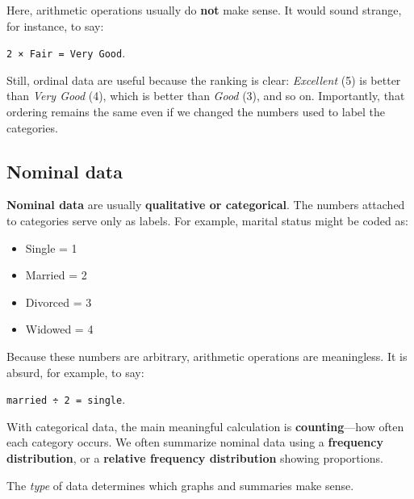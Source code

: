 \documentclass[
  letterpaper,
  DIV=11,
  numbers=noendperiod]{scrreprt}
\providecommand{\tightlist}{%
  \setlength{\itemsep}{0pt}\setlength{\parskip}{0pt}}
\begin{document}
Here, arithmetic operations usually do \textbf{not} make sense. It would
sound strange, for instance, to say:

\texttt{2\ ×\ Fair\ =\ Very\ Good}.

Still, ordinal data are useful because the ranking is clear:
\emph{Excellent} (5) is better than \emph{Very Good} (4), which is
better than \emph{Good} (3), and so on. Importantly, that ordering
remains the same even if we changed the numbers used to label the
categories.

\subsection{Nominal data}\label{nominal-data}

\textbf{Nominal data} are usually \textbf{qualitative or categorical}.
The numbers attached to categories serve only as labels. For example,
marital status might be coded as:

\begin{itemize}
\tightlist
\item
  Single = 1\\
\item
  Married = 2\\
\item
  Divorced = 3\\
\item
  Widowed = 4
\end{itemize}

Because these numbers are arbitrary, arithmetic operations are
meaningless. It is absurd, for example, to say:

\texttt{married\ ÷\ 2\ =\ single}.

With categorical data, the main meaningful calculation is
\textbf{counting}---how often each category occurs. We often summarize
nominal data using a \textbf{frequency distribution}, or a
\textbf{relative frequency distribution} showing proportions.

\begin{tcolorbox}[enhanced jigsaw, coltitle=black, colbacktitle=quarto-callout-important-color!10!white, left=2mm, bottomrule=.15mm, bottomtitle=1mm, colback=white, titlerule=0mm, colframe=quarto-callout-important-color-frame, breakable, leftrule=.75mm, toptitle=1mm, opacitybacktitle=0.6, rightrule=.15mm, title=\textcolor{quarto-callout-important-color}{\faExclamation}\hspace{0.5em}{Key idea}, arc=.35mm, opacityback=0, toprule=.15mm]

The \emph{type} of data determines which graphs and summaries make
sense.

\end{tcolorbox}
\end{document}
